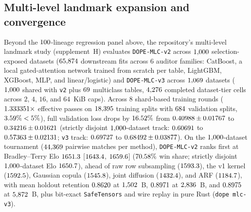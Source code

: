 \documentclass{article} %
\begin{document}
\subsection{Multi-level landmark expansion and convergence}
\label{sec:multilevel}
Beyond the $100$-lineage regression panel above, the repository's multi-level landmark study (supplement~H) evaluates \texttt{DOPE-MLC-v2} across $1{,}000$ selection-exposed datasets ($65{,}874$ downstream fits across $6$ auditor families: CatBoost, a local gated-attention network trained from scratch per table, LightGBM, XGBoost, MLP, and linear/logistic) and \texttt{DOPE-MLC-v3} across $1{,}069$ datasets ($1{,}000$ shared with \texttt{v2} plus $69$ multiclass tables, $4{,}276$ completed dataset-tier cells across $2$, $4$, $16$, and $64$~KiB caps). Across $8$ shard-based training rounds ($1.333351\times$ effective passes on $18{,}395$ training splits with $684$ validation splits, $3.59\% < 5\%$), full validation loss drops by $16.52\%$ from $0.40988 \pm 0.01767$ to $0.34216 \pm 0.01621$ (strictly disjoint $1{,}000$-dataset track: $0.60691$ to $0.57363 \pm 0.02131$; \texttt{v3} track: $0.69727$ to $0.68492 \pm 0.03877$). On the $1{,}000$-dataset tournament ($44{,}369$ pairwise matches per method), \texttt{DOPE-MLC-v2} ranks first at Bradley--Terry Elo $1651.3$ [$1643.4$, $1659.6$] ($70.58\%$ win share; strictly disjoint $1{,}000$-dataset Elo $1650.7$), ahead of raw row subsampling ($1593.3$), the v1 kernel ($1592.5$), Gaussian copula ($1545.8$), joint diffusion ($1432.4$), and ARF ($1184.7$), with mean holdout retention $0.8620$ at $1{,}502$~B, $0.8971$ at $2{,}836$~B, and $0.8975$ at $5{,}872$~B, plus bit-exact \texttt{SafeTensors} and wire replay in pure Rust (\texttt{dope mlc-v3}).
\end{document}
